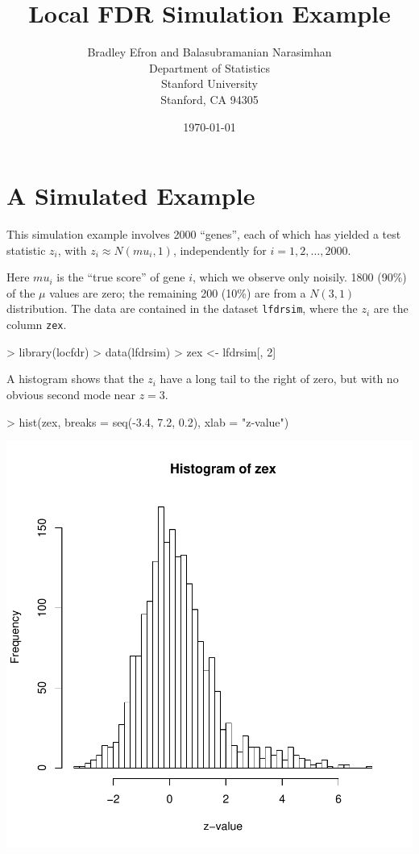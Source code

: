 \documentclass[11pt]{article}
\title{Local FDR Simulation Example}
\author{Bradley Efron and Balasubramanian Narasimhan\\
  Department of Statistics\\
  Stanford University\\ 
  Stanford, CA 94305}
\date{\today}
\begin{document}
\maketitle

\section{A Simulated Example}
This simulation example involves 2000 ``genes'', each of which has
yielded a test statistic $z_i$, with $z_i \approx N(mu_i, 1)$,
independently for $i=1,2,\ldots,2000$.

Here $mu_i$ is the ``true score'' of gene $i$, which we observe only
noisily. 1800 (90\%) of the $\mu$ values are zero; the remaining 200
(10\%) are from a $N(3,1)$ distribution. The data are contained in the
dataset \texttt{lfdrsim}, where the $z_i$ are the column \texttt{zex}.  

\begin{Schunk}
\begin{Sinput}
> library(locfdr)
> data(lfdrsim)
> zex <- lfdrsim[, 2]
\end{Sinput}
\end{Schunk}

A histogram shows that the $z_i$ have a long tail to the right of
zero, but with no obvious second mode near $z=3$.


\begin{Schunk}
\begin{Sinput}
> hist(zex, breaks = seq(-3.4, 7.2, 0.2), xlab = "z-value")
\end{Sinput}
\end{Schunk}
\includegraphics{locfdr-example-Histogram}
\end{document}
